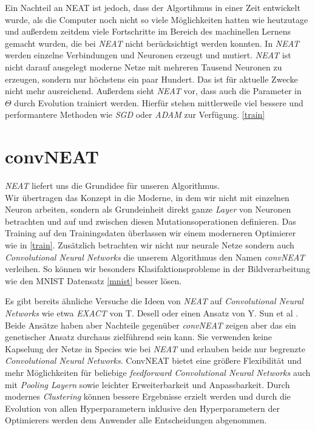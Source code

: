 \documentclass[]{scrartcl}
\begin{document}
			Ein Nachteil an NEAT ist jedoch, dass der Algortihmus in einer Zeit entwickelt wurde, als die Computer noch nicht so viele Möglichkeiten hatten wie heutzutage
			und außerdem zeitdem viele Fortschritte im Bereich des machinellen Lernens gemacht wurden, die bei \textit{NEAT} nicht berücksichtigt werden konnten.
			In \textit{NEAT} werden einzelne Verbindungen und Neuronen erzeugt und mutiert. \textit{NEAT} ist nicht darauf ausgelegt moderne Netze
			mit mehreren Tausend Neuronen zu erzeugen, sondern nur höchstens ein paar Hundert. Das ist für aktuelle Zwecke nicht mehr ausreichend.
			Außerdem sieht \textit{NEAT} vor, dass auch die Parameter in $\Theta$ durch Evolution trainiert werden. Hierfür stehen
			mittlerweile viel bessere und performantere Methoden wie \textit{SGD} oder \textit{ADAM} zur Verfügung. \ref{train}

	\clearpage

	\section{convNEAT}

		\textit{NEAT} liefert uns die Grundidee für unseren Algorithmus. \\
		Wir übertragen das Konzept in die Moderne, in dem wir nicht mit einzelnen Neuron arbeiten,
		sondern als Grundeinheit direkt ganze \textit{Layer} von Neuronen betrachten und auf und zwischen diesen Mutationsoperationen definieren.
		Das Training auf den Trainingsdaten überlassen wir einem moderneren Optimierer wie in \ref{train}.
		Zusätzlich betrachten wir nicht nur neurale Netze sondern auch \textit{Convolutional Neural Networks} die unserem Algorithmus den Namen \textit{convNEAT}
		verleihen. So können wir besonders Klasifaktionsprobleme in der Bildverarbeitung wie den MNIST Datensatz \ref{mnist} besser lösen.

		Es gibt bereits ähnliche Versuche die Ideen von \textit{NEAT} auf \textit{Convolutional Neural Networks} wie etwa
		\textit{EXACT} von T. Desell \cite{exact} oder einen Ansatz von Y. Sun et al \cite{convoneat}.
		Beide Ansätze haben aber Nachteile gegenüber \textit{convNEAT} zeigen aber das ein genetischer Ansatz durchaus zielführend sein kann.
		Sie verwenden keine Kapselung der Netze in Species wie bei \textit{NEAT} und erlauben beide nur begrenzte \textit{Convolutional Neural Networks}.
		ConvNEAT bietet eine größere Flexibilität und mehr Möglichkeiten für beliebige \textit{feedforward Convolutional Neural Networks}
		auch mit \textit{Pooling Layern} sowie leichter Erweiterbarkeit und Anpassbarkeit. Durch modernes \textit{Clustering} können
		bessere Ergebnisse erzielt werden und durch die Evolution von allen Hyperparametern inklusive den Hyperparametern der Optimierers
		werden dem Anwender alle Entscheidungen abgenommen.
		
\end{document}
